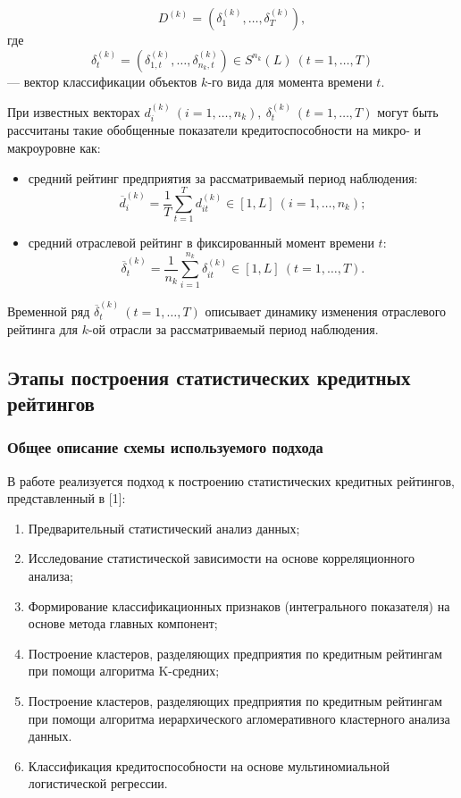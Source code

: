 \documentclass[14pt,a4paper]{extarticle}
\begin{document}
\[
D^{(k)} = \left( \delta_{1}^{(k)},\ldots,\delta_{T}^{(k)} \right),
\]
где
\[
\delta_{t}^{(k)} = \left( \delta_{1,t}^{(k)},\ldots,\delta_{n_{k},t}^{(k)} \right) \in S^{n_{k}}(L)\ (t=1,\ldots,T)
\]
--- вектор классификации объектов $k$-го вида для момента времени $t$.

При известных векторах $d_{i}^{(k)}\ (i=1,\ldots,n_{k}),\ \delta_{t}^{(k)}\ (t=1,\ldots,T)$ могут быть рассчитаны такие обобщенные показатели кредитоспособности на микро- и макроуровне как:
\begin{itemize}
    \item средний рейтинг предприятия за рассматриваемый период наблюдения:
    \[
    \overline{d}_{i}^{(k)} = \frac{1}{T}\sum_{t=1}^{T} d_{it}^{(k)} \in [1,L]\ (i=1,\ldots,n_{k});
    \]
    \item средний отраслевой рейтинг в фиксированный момент времени $t$:
    \[
    \overline{\delta}_{t}^{(k)} = \frac{1}{n_{k}}\sum_{i=1}^{n_{k}} \delta_{it}^{(k)} \in [1,L]\ (t=1,\ldots,T).
    \]
\end{itemize}
Временной ряд $\overline{\delta}_{t}^{(k)}\ (t=1,\ldots,T)$ описывает динамику изменения отраслевого рейтинга для $k$-ой отрасли за рассматриваемый период наблюдения.

\subsection{Этапы построения статистических кредитных рейтингов}

\subsubsection{Общее описание схемы используемого подхода}

В работе реализуется подход к построению статистических кредитных рейтингов, представленный в [1]:
\begin{enumerate}
    \item Предварительный статистический анализ данных;
    \item Исследование статистической зависимости на основе 
    корреляционного анализа;
    \item Формирование классификационных признаков (интегрального 
    показателя) на основе метода главных компонент;
    \item Построение кластеров, разделяющих предприятия по кредитным 
    рейтингам при помощи алгоритма K-средних;
    \item Построение кластеров, разделяющих предприятия по кредитным 
    рейтингам при помощи алгоритма иерархического агломеративного 
    кластерного анализа данных.
    \item Классификация кредитоспособности на основе мультиномиальной 
    логистической регрессии.
\end{enumerate}
\end{document}
